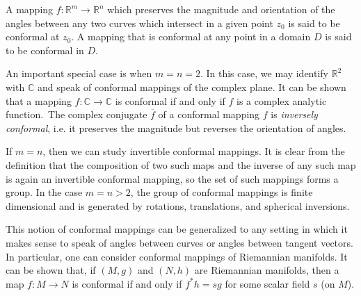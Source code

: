 \documentclass[12pt]{article}
\begin{document}
A mapping $f \colon \mathbb{R}^m \to \mathbb{R}^n$ which preserves the magnitude and orientation of the angles between any two curves which intersect in a given point $z_0$ is said to be conformal at $z_0$. A mapping that is conformal at any point in a domain $D$ is said to be conformal in $D$.

An important special case is when $m = n = 2$.  In this case, we may identify $\mathbb{R}^2$ with $\mathbb{C}$ and speak of conformal mappings of the complex plane.  It can be shown that a mapping $f \colon \mathbb{C} \to \mathbb{C}$ is conformal if and only if $f$ is a complex analytic function.\, The complex conjugate $\overline{f}$ of a conformal mapping $f$ is {\em inversely conformal}, i.e. it preserves the magnitude but reverses the orientation of angles.

If $m = n$, then we can study invertible conformal mappings.  It is clear from the definition that the composition of two such maps and the inverse of any such map is again an invertible conformal mapping, so the set of such mappings forms a group.  In the case $m = n > 2$, the group of conformal mappings is finite dimensional and is generated by rotations, translations, and spherical inversions.

This notion of conformal mappings can be generalized to any setting in which it makes sense to speak of angles between curves or angles between tangent vectors.  In particular, one can consider conformal mappings of Riemannian manifolds.  It can be shown that, if $(M,g)$ and $(N,h)$ are Riemannian manifolds, then a map $f \colon M \to N$ is conformal if and only if $f^* h = s g$ for some scalar field $s$ (on $M$).
\end{document}

